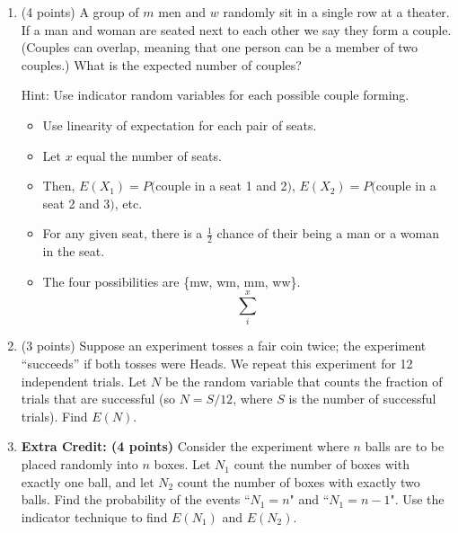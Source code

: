 \documentclass[11pt]{article}
\begin{document}
\begin{enumerate}
\item (4 points) A group of $m$ men and $w$ randomly sit in a single row at a
theater.  If a man and woman are seated next to each other we say they form a
couple.  (Couples can overlap, meaning that one person can be a member of two
couples.)  What is the expected number of couples?
\begin{small}\textsf{Hint: Use indicator
random variables for each possible couple forming.
}\end{small}

\begin{itemize}

	\item Use linearity of expectation for each pair of seats.
	\item Let $x$ equal the number of seats.
	\item Then, $E(X_1) = P($couple in a seat 1 and 2$)$, $E(X_2) = P($couple in a seat 2 and 3$)$, etc.
	\item For any given seat, there is a $\frac{1}{2}$ chance of their being a man or a woman in the seat.
	\item The four possibilities are \{mw, wm, mm, ww\}.
		  \[\sum_{i}^{x} \]

\end{itemize}

\item (3 points) Suppose an experiment tosses a fair coin twice;  the experiment
``succeeds'' if both tosses were Heads.  We repeat this experiment 
for 12 independent trials.  Let $N$ be the random variable that counts
the fraction of trials that are successful (so $N = S/12$, where
$S$ is the number of successful trials).  Find $E(N)$.

\item \textbf{Extra Credit: (4 points)} Consider the experiment where $n$ balls
are to be placed randomly into $n$ boxes. Let $N_1$ count the number of boxes
with exactly one ball, and let $N_2$ count the number of boxes with exactly two
balls. Find the probability of the events ``$N_1 = n$" and ``$N_1 = n - 1$".
Use the indicator technique to find $E(N_1)$ and $E(N_2)$.


\end{enumerate}
\end{document}
